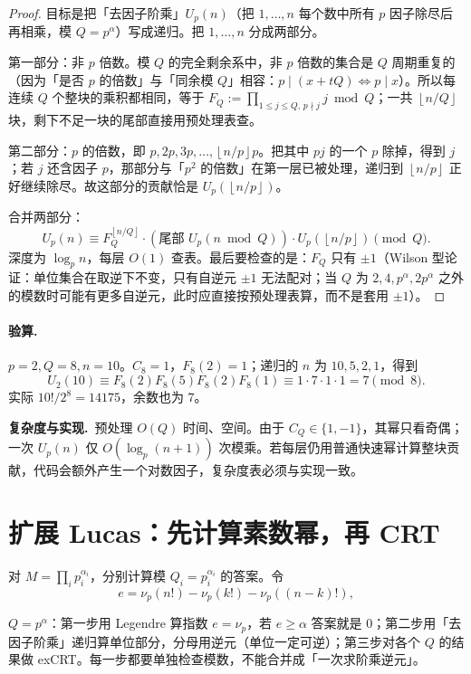 \documentclass[UTF8,a4paper,11pt,twoside,openright,fontset=fandol]{ctexbook}
\theoremstyle{definition}
\newcommand{\floor}[1]{\left\lfloor #1\right\rfloor}
\newcommand{\cost}{\par\noindent\textbf{复杂度与实现.}\ }
\begin{document}
\begin{proof}
目标是把「去因子阶乘」$U_p(n)$（把 $1,\ldots,n$ 每个数中所有 $p$ 因子除尽后再相乘，模 $Q=p^\alpha$）写成递归。把 $1,\ldots,n$ 分成两部分。

第一部分：非 $p$ 倍数。模 $Q$ 的完全剩余系中，非 $p$ 倍数的集合是 $Q$ 周期重复的（因为「是否 $p$ 的倍数」与「同余模 $Q$」相容：$p\mid(x+tQ)\iff p\mid x$）。所以每连续 $Q$ 个整块的乘积都相同，等于 $F_Q:=\prod_{1\le j\le Q,\,p\nmid j}j\bmod Q$；一共 $\floor{n/Q}$ 块，剩下不足一块的尾部直接用预处理表查。

第二部分：$p$ 的倍数，即 $p,2p,3p,\ldots,\floor{n/p}p$。把其中 $pj$ 的一个 $p$ 除掉，得到 $j$；若 $j$ 还含因子 $p$，那部分与「$p^2$ 的倍数」在第一层已被处理，递归到 $\floor{n/p}$ 正好继续除尽。故这部分的贡献恰是 $U_p(\floor{n/p})$。

合并两部分：
\[
 U_p(n)\equiv F_Q^{\floor{n/Q}}\cdot(\text{尾部 }U_p(n\bmod Q))\cdot U_p(\floor{n/p})\pmod Q .
\]
深度为 $\log_p n$，每层 $O(1)$ 查表。最后要检查的是：$F_Q$ 只有 $\pm1$（Wilson 型论证：单位集合在取逆下不变，只有自逆元 $\pm1$ 无法配对；当 $Q$ 为 $2,4,p^\alpha,2p^\alpha$ 之外的模数时可能有更多自逆元，此时应直接按预处理表算，而不是套用 $\pm1$）。
\end{proof}
\paragraph{验算.} $p=2,Q=8,n=10$。$C_8=1$，$F_8(2)=1$；递归的 $n$ 为 $10,5,2,1$，得到
\[
 U_2(10)\equiv F_8(2)F_8(5)F_8(2)F_8(1)
 \equiv1\cdot7\cdot1\cdot1=7\pmod8.
\]
实际 $10!/2^8=14175$，余数也为 $7$。
\cost 预处理 $O(Q)$ 时间、空间。由于 $C_Q\in\{1,-1\}$，其幂只看奇偶；一次 $U_p(n)$ 仅 $O(\log_p(n+1))$ 次模乘。若每层仍用普通快速幂计算整块贡献，代码会额外产生一个对数因子，复杂度表必须与实现一致。


\section{扩展 Lucas：先计算素数幂，再 CRT}
对 $M=\prod_i p_i^{\alpha_i}$，分别计算模 $Q_i=p_i^{\alpha_i}$ 的答案。令
\[
 e=\nu_p(n!)-\nu_p(k!)-\nu_p((n-k)!),
\]

\begin{tip}[三步流程]
$Q=p^\alpha$：第一步用 Legendre 算指数 $e=\nu_p$，若 $e\ge\alpha$ 答案就是 $0$；第二步用「去因子阶乘」递归算单位部分，分母用逆元（单位一定可逆）；第三步对各个 $Q$ 的结果做 exCRT。每一步都要单独检查模数，不能合并成「一次求阶乘逆元」。
\end{tip}
\end{document}
